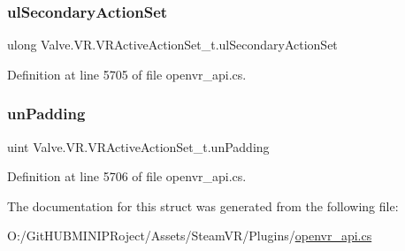 \subsubsection{\texorpdfstring{ulSecondaryActionSet}{ulSecondaryActionSet}}
{\footnotesize\ttfamily ulong Valve.\+V\+R.\+V\+R\+Active\+Action\+Set\+\_\+t.\+ul\+Secondary\+Action\+Set}



Definition at line 5705 of file openvr\+\_\+api.\+cs.

\mbox{\label{struct_valve_1_1_v_r_1_1_v_r_active_action_set__t_ae8e073e93ec102a2277c338986882714}} 
\subsubsection{\texorpdfstring{unPadding}{unPadding}}
{\footnotesize\ttfamily uint Valve.\+V\+R.\+V\+R\+Active\+Action\+Set\+\_\+t.\+un\+Padding}



Definition at line 5706 of file openvr\+\_\+api.\+cs.



The documentation for this struct was generated from the following file\+:\begin{DoxyCompactItemize}
\item 
O\+:/\+Git\+H\+U\+B\+M\+I\+N\+I\+P\+Roject/\+Assets/\+Steam\+V\+R/\+Plugins/\mbox{\hyperlink{openvr__api_8cs}{openvr\+\_\+api.\+cs}}\end{DoxyCompactItemize}

